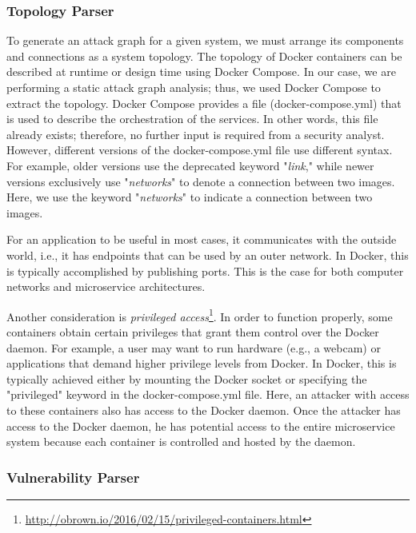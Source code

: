 \subsubsection{Topology Parser}
\label{chap:topology_p}

To generate an attack graph for a given system, we must arrange its components and connections as a system topology. The topology of Docker containers can be described at runtime or design time using Docker Compose. In our case, we are performing a static attack graph analysis; thus, we used Docker Compose to extract the topology. Docker Compose provides a file (docker-compose.yml) that is used to describe the orchestration of the services. In other words, this file already exists; therefore, no further input is required from a security analyst. However, different versions of the docker-compose.yml file use different syntax. For example, older versions use the deprecated keyword "\textit{link}," while newer versions exclusively use "\textit{networks}" to denote a connection between two images. Here, we use the keyword "\textit{networks}" to indicate a connection between two images.

For an application to be useful in most cases, it communicates with the outside world, i.e., it has endpoints that can be used by an outer network. In Docker, this is typically accomplished by publishing ports. This is the case for both computer networks and microservice architectures.

Another consideration is \textit{privileged access}\footnote{\url{http://obrown.io/2016/02/15/privileged-containers.html}}. In order to function properly, some containers obtain certain privileges that grant them control over the Docker daemon. For example, a user may want to run hardware (e.g., a webcam) or applications that demand higher privilege levels from Docker. In Docker, this is typically achieved either by mounting the Docker socket or specifying the "privileged" keyword in the docker-compose.yml file. Here, an attacker with access to these containers also has access to the Docker daemon. Once the attacker has access to the Docker daemon, he has potential access to the entire microservice system because each container is controlled and hosted by the daemon.

\subsubsection{Vulnerability Parser}
\label{chap:vulnerability_p}

